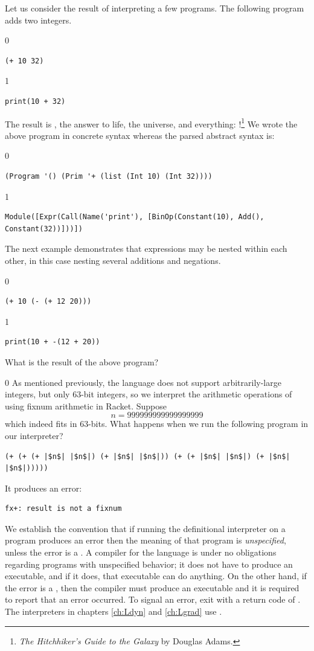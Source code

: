 \documentclass[7x10,nocrop]{TimesAPriori_MIT}%
\def\racketEd{0}
\def\pythonEd{1}
\def\edition{1}
\begin{document}
Let us consider the result of interpreting a few \LangInt{} programs. The
following program adds two integers.
{\if\edition\racketEd
\begin{lstlisting}
(+ 10 32)
\end{lstlisting}
\fi}
{\if\edition\pythonEd
\begin{lstlisting}
print(10 + 32)
\end{lstlisting}
\fi}
The result is , the answer to life, the universe, and
everything: !\footnote{\emph{The Hitchhiker's Guide to the
    Galaxy} by Douglas Adams.}
%
We wrote the above program in concrete syntax whereas the parsed
abstract syntax is:
{\if\edition\racketEd
\begin{lstlisting}
(Program '() (Prim '+ (list (Int 10) (Int 32))))
\end{lstlisting}
\fi}
{\if\edition\pythonEd
\begin{lstlisting}
Module([Expr(Call(Name('print'), [BinOp(Constant(10), Add(), Constant(32))]))])    
\end{lstlisting}
\fi}
The next example demonstrates that expressions may be nested within
each other, in this case nesting several additions and negations.
{\if\edition\racketEd
\begin{lstlisting}
(+ 10 (- (+ 12 20)))
\end{lstlisting}
\fi}
{\if\edition\pythonEd
\begin{lstlisting}
print(10 + -(12 + 20))
\end{lstlisting}
\fi}
%
\noindent What is the result of the above program?

{\if\edition\racketEd
As mentioned previously, the \LangInt{} language does not support
arbitrarily-large integers, but only $63$-bit integers, so we
interpret the arithmetic operations of \LangInt{} using fixnum arithmetic
in Racket.
Suppose
\[
  n = 999999999999999999
\]
which indeed fits in $63$-bits.  What happens when we run the
following program in our interpreter?
\begin{lstlisting}
(+ (+ (+ |$n$| |$n$|) (+ |$n$| |$n$|)) (+ (+ |$n$| |$n$|) (+ |$n$| |$n$|)))))
\end{lstlisting}
It produces an error:
\begin{lstlisting}
fx+: result is not a fixnum
\end{lstlisting}
We establish the convention that if running the definitional
interpreter on a program produces an error then the meaning of that
program is \emph{unspecified}, unless the
error is a . A compiler for the language is under
no obligations regarding programs with unspecified behavior; it does
not have to produce an executable, and if it does, that executable can
do anything.  On the other hand, if the error is a
, then the compiler must produce an executable and
it is required to report that an error occurred. To signal an error,
exit with a return code of .  The interpreters in chapters
\ref{ch:Ldyn} and \ref{ch:Lgrad} use
.
\fi}
\end{document}
